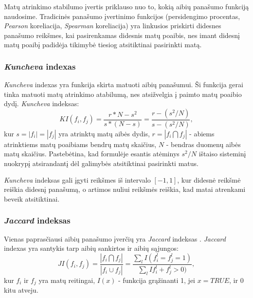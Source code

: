 Matų atrinkimo stabilumo įvertis priklauso nuo to, kokią aibių panašumo funkciją naudosime. Tradicinės panašumo įvertinimo funkcijos (persidengimo procentas, \textit{Pearson} koreliacija, \textit{Spearman} koreliacija) yra linkusios priskirti didesnes panašumo reikšmes, kai pasirenkamas didesnis matų poaibis, nes imant didesnį matų poaibį padidėja tikimybė tiesiog atsitiktinai pasirinkti matą.

\subsubsection{\textit{Kuncheva} indexas}

\textit{Kuncheva} indexas \cite{DBLP:conf/aia/Kuncheva07} yra funkcija skirta matuoti aibių panašumui. Ši funkcija gerai tinka matuoti matų atrinkimo atabilumą, nes atsižvelgia į paimto matų poaibio dydį. \textit{Kuncheva} indeksas:
\begin{equation}
\label{kuncheva_index}
 KI(f_i, f_j)=\frac{r*N - s^2}{s*(N-s)}=\frac{r - (s^2/N)}{s - (s^2/N)},
\end{equation}		
kur $s=|f_i|=|f_j|$ yra atrinktų matų aibės dydis, $r=|f_i \bigcap f_j|$ - abiems atrinktiems matų poaibiams bendrų matų skaičius, $N$ - bendras  duomenų aibės matų skaičius. Pastebėtina, kad formulėje esantis atėminys $s^2/N$ ištaiso sisteminį nuokrypį atsirandantį dėl galimybės atsitiktinai pasirinkti matus. 

\textit{Kuncheva} indeksas gali įgyti reikšmes iš intervalo $[-1, 1]$, kur didesnė reikšmė reiškia didesnį panašumą, o artimos nuliui reikšmės reiškia, kad matai atrenkami beveik atsitiktinai.

\subsubsection{\textit{Jaccard} indeksas}

Vienas paprasčiausi aibių panašumo įverčių yra \textit{Jaccard} indeksas \cite{jaccard1901etude}. \textit{Jaccard} indexas yra santykis tarp aibių sankirtos ir aibių sąjungos:
\begin{equation}
\label{jaccard_index}
 JI(f_i, f_j)=\frac{|f_i \bigcap f_j|}{|f_i \cup f_j|}=\frac{\sum_{l}I(f_i^l=f_j^l=1)}{\sum_{l}I{f_i^l+f_j^l > 0)}}, 
\end{equation}
kur $f_i$ ir $f_j$ yra matų reitingai, $I(x)$ - funkcija grąžinanti 1, jei $x=TRUE$, ir 0 kitu atveju.

